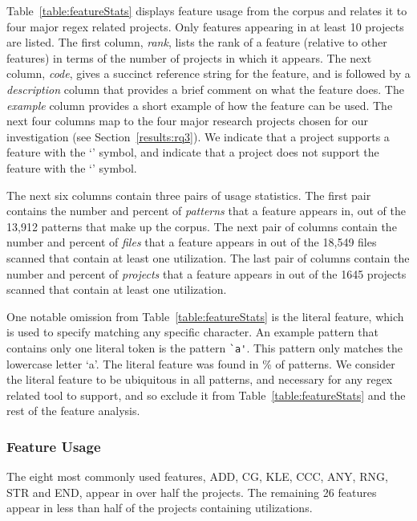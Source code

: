Table~\ref{table:featureStats} displays feature usage from the corpus and relates it to four major regex related projects. Only features appearing in at least 10 projects are listed.
The first column, \emph{rank}, lists the rank of a feature (relative to other features) in terms of the number of projects in which it appears. The next column, \emph{code}, gives a succinct reference string for the feature, and is followed by a \emph{description} column that provides a brief comment on what the feature does.  The \emph{example} column provides a short example of how the feature can be used.
The next four columns map to the four major research projects chosen for our investigation (see Section~\ref{results:rq3}).  We indicate that a project supports a feature with the `\yes' symbol, and indicate that a project does not support the feature with the `\no' symbol.

The next six columns contain three pairs of usage statistics.  The first pair contains the number and percent of \emph{patterns} that a feature appears in, out of the 13,912 patterns that make up the corpus. The next pair of columns contain the number and percent of \emph{files} that a feature appears in out of the 18,549 files scanned that contain at least one utilization.  The last pair of columns contain the number and percent of \emph{projects} that a feature appears in out of the 1645 projects scanned that contain at least one utilization.

One notable omission from Table~\ref{table:featureStats} is the literal feature, which is used  to specify matching any specific character.  An example pattern that contains only one literal token is the pattern \verb!`a'!.  This pattern only matches the lowercase letter `a'.  The literal feature was found in \% of patterns.
We consider the literal feature to be ubiquitous in all patterns, and necessary for any regex related tool to support, and so exclude it from Table~\ref{table:featureStats} and the rest of the feature analysis.


\subsubsection{Feature Usage}
The eight most commonly used features, ADD, CG, KLE, CCC, ANY, RNG, STR and END,
appear in over half the projects. The remaining 26 features appear in less than half of the projects containing utilizations.

